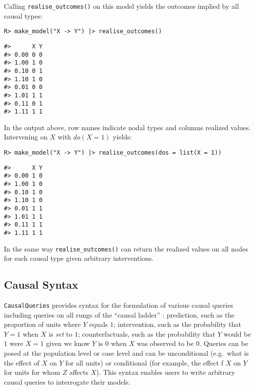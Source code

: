\documentclass[
  11pt,
  article]{jss}
\begin{document}
Calling \texttt{realise\_outcomes()} on this model yields the outcomes
implied by all causal types:

\begin{verbatim}
R> make_model("X -> Y") |> realise_outcomes()
\end{verbatim}

\begin{verbatim}
#>      X Y
#> 0.00 0 0
#> 1.00 1 0
#> 0.10 0 1
#> 1.10 1 0
#> 0.01 0 0
#> 1.01 1 1
#> 0.11 0 1
#> 1.11 1 1
\end{verbatim}

In the output above, row names indicate nodal types and columns realized
values. Intervening on \(X\) \citep[see][]{pearl_causality_2009} with
\(do(X=1)\) yields:

\begin{verbatim}
R> make_model("X -> Y") |> realise_outcomes(dos = list(X = 1))
\end{verbatim}

\begin{verbatim}
#>      X Y
#> 0.00 1 0
#> 1.00 1 0
#> 0.10 1 0
#> 1.10 1 0
#> 0.01 1 1
#> 1.01 1 1
#> 0.11 1 1
#> 1.11 1 1
\end{verbatim}

In the same way \texttt{realise\_outcomes()} can return the realized
values on all nodes for each causal type given arbitrary interventions.

\hypertarget{sec-syntax}{%
\subsection{Causal Syntax}\label{sec-syntax}}

\texttt{CausalQueries} provides syntax for the formulation of various
causal queries including queries on all rungs of the ``causal ladder''
\citep{pearl_causality_2009}: prediction, such as the proportion of
units where \(Y\) equals \(1\); intervention, such as the probability
that \(Y = 1\) when \(X\) is \emph{set} to \(1\); counterfactuals, such
as the probability that \(Y\) would be \(1\) were \(X = 1\) given we
know \(Y\) is \(0\) when \(X\) was observed to be \(0\). Queries can be
posed at the population level or case level and can be unconditional
(e.g.~what is the effect of \(X\) on \(Y\) for all units) or conditional
(for example, the effect f \(X\) on \(Y\) for units for whom \(Z\)
affects \(X\)). This syntax enables users to write arbitrary causal
queries to interrogate their models.
\end{document}
